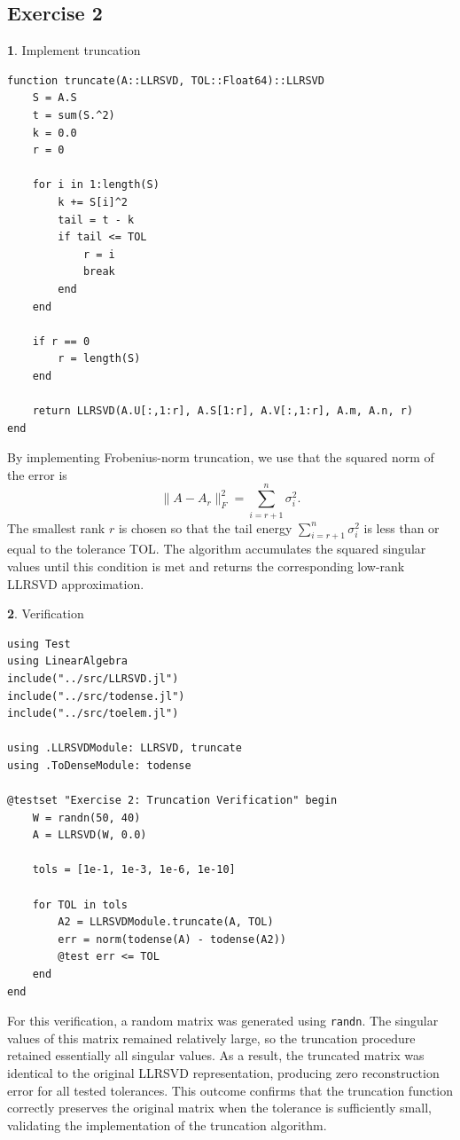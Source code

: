\documentclass[11pt]{article}
\begin{document}
\subsection*{Exercise 2}
\textbf{1}. Implement truncation

\begin{lstlisting}
function truncate(A::LLRSVD, TOL::Float64)::LLRSVD
    S = A.S
    t = sum(S.^2)
    k = 0.0
    r = 0

    for i in 1:length(S)
        k += S[i]^2
        tail = t - k
        if tail <= TOL
            r = i
            break
        end
    end

    if r == 0
        r = length(S)
    end

    return LLRSVD(A.U[:,1:r], A.S[1:r], A.V[:,1:r], A.m, A.n, r)
end
\end{lstlisting}

By implementing Frobenius-norm truncation, we use that the squared norm of the error is 
\[
\|A - A_r\|_F^2 = \sum_{i=r+1}^n \sigma_i^2.
\]
The smallest rank $r$ is chosen so that the tail energy 
$\sum_{i=r+1}^n \sigma_i^2$ is less than or equal to the tolerance TOL. 
The algorithm accumulates the squared singular values until this condition 
is met and returns the corresponding low-rank LLRSVD approximation.

\vspace{1.5em}

\textbf{2}. Verification
\begin{lstlisting}
using Test
using LinearAlgebra
include("../src/LLRSVD.jl")
include("../src/todense.jl")
include("../src/toelem.jl")

using .LLRSVDModule: LLRSVD, truncate
using .ToDenseModule: todense

@testset "Exercise 2: Truncation Verification" begin
    W = randn(50, 40)
    A = LLRSVD(W, 0.0)

    tols = [1e-1, 1e-3, 1e-6, 1e-10]

    for TOL in tols
        A2 = LLRSVDModule.truncate(A, TOL)
        err = norm(todense(A) - todense(A2))
        @test err <= TOL
    end
end
\end{lstlisting}

For this verification, a random matrix was generated using
\texttt{randn}. The singular values of this matrix remained relatively
large, so the truncation procedure retained essentially all singular
values. As a result, the truncated matrix was identical to the original
LLRSVD representation, producing zero reconstruction error for all
tested tolerances. This outcome confirms that the truncation function correctly preserves the
original matrix when the tolerance is sufficiently small, validating the implementation of the truncation algorithm.
\end{document}
